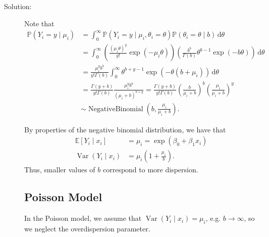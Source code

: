 \documentclass[letterpaper,11pt]{article}
\begin{document}
\begin{enumerate}
  \begin{description}
  \item[Solution:] Note that
    \begin{align}
      \mathbb{P}\left(
      Y_i = y \mid \mu_i
      \right)
      &= \int_0^\infty\mathbb{P}\left(
      Y_i = y \mid \mu_i, \theta_i = \theta
      \right)\mathbb{P}\left(
      \theta_i = \theta
      \mid b
        \right)
        \,\mathrm{d}\theta \nonumber\\
      &= \int_0^\infty
        \left(
        \frac{\left(\mu_i\theta\right)^y}{y!}\exp\left(-\mu_i\theta\right)
        \right)
        \left(
        \frac{b^b}{\Gamma(b)}\theta^{b-1}
        \exp\left(-b\theta\right)
        \right)        
        \,\mathrm{d}\theta \nonumber\\
      &= \frac{\mu_i^y b^b}{y!\Gamma(b)}
        \int_0^\infty
        \theta^{b + y - 1}\exp\left(-\theta(b + \mu_i)\right)
        \,\mathrm{d}\theta \nonumber\\
      &= \frac{\Gamma(y + b)}{y!\Gamma(b)}
        \frac{\mu_i^y b^b}{\left(\mu_i + b\right)^{b + y}}
        = \frac{\Gamma(y + b)}{y!\Gamma(b)}
        \left(\frac{b}{\mu_i + b}\right)^b
        \left(\frac{\mu_i}{\mu_i + b}\right)^y
        \nonumber\\
      &\sim \operatorname{NegativeBinomial}\left(
        b,
        \frac{\mu_i}{\mu_i + b}
        \right).
        \label{eqn:p1_negative_binomial}
    \end{align}

    By properties of the negative binomial distribution, we have that
    \begin{align}
      \mathbb{E}\left[
      Y_i
      \mid x_i
      \right]
      &= \mu_i = \exp\left(\beta_0 + \beta_1x_i\right) \nonumber\\
      \operatorname{Var}\left(Y_i \mid x_i\right)
      &= \mu_i\left(
        1 + \frac{\mu_i}{b}
        \right).
      \label{eqn:p1_y_mean_variance}
    \end{align}
    Thus, smaller values of $b$ correspond to more dispersion.

    \subsection*{Poisson Model}

    In the Poisson model, we assume that
    $\operatorname{Var}\left(Y_i \mid x_i\right) = \mu_i$, e.g.
    $b \rightarrow \infty$, so we neglect the overdispersion parameter.


\end{description}
\end{enumerate}
\end{document}
